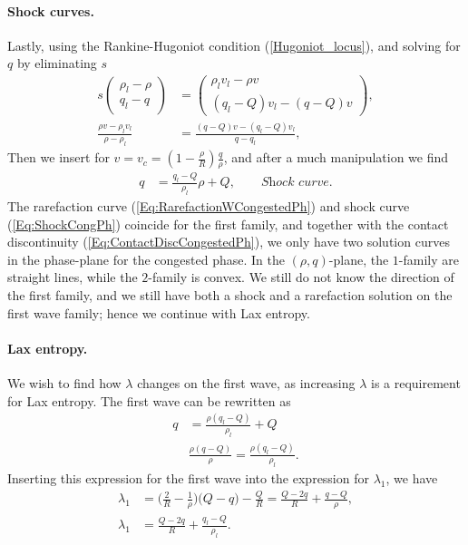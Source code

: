 \documentclass[10pt]{article}
\numberwithin{equation}{section}
\begin{document}
\paragraph{Shock curves.}
Lastly, using the Rankine-Hugoniot condition (\ref{Hugoniot_locus}), and solving for $q$ by eliminating $s$
\begin{align*}
     s \begin{pmatrix} \rho_l - \rho \\ q_l - q \end{pmatrix} &= \begin{pmatrix} \rho_l v_l - \rho v \\ (q_l - Q)v_l - (q - Q)v \end{pmatrix}, \nonumber\\
     \frac{\rho v - \rho_l v_l}{\rho - \rho_l} &= \frac{(q-Q)v - (q_l-Q)v_l}{q - q_l}, \nonumber
\end{align*}
Then we insert for $v = v_c = (1- \frac{\rho}{R})\frac{q}{\rho}$, and after a much manipulation we find
\begin{align}
      q &= \frac{q_l - Q}{\rho_l} \rho + Q,  \quad \quad \textit{Shock curve.}
     \label{Eq:ShockCongPh}
\end{align}
The rarefaction curve (\ref{Eq:RarefactionWCongestedPh}) and shock curve (\ref{Eq:ShockCongPh}) coincide for the first family, and together with the contact discontinuity (\ref{Eq:ContactDiscCongestedPh}), we only have two solution curves in the phase-plane for the congested phase. In the $(\rho,q)$-plane, the $1$-family are straight lines, while the $2$-family is convex.
We still do not know the direction of the first family, and we still have both a shock and a rarefaction solution on the first wave family; hence we continue with Lax entropy. 

\paragraph{Lax entropy.}
We wish to find how $\lambda$ changes on the first wave, as increasing $\lambda$ is a requirement for Lax entropy. The first wave can be rewritten as 
\begin{align*}
q &=  \frac{\rho( q_l - Q)}{\rho_l} + Q \\
 & \frac{\rho( q - Q)}{\rho}  =  \frac{\rho( q_l - Q)}{\rho_l}.
\end{align*}
Inserting this expression for the first wave into the expression for $\lambda_1$, we have
\begin{align}
     \lambda_1 &= \big ( \frac{2}{R} - \frac{1}{\rho} )\big (Q- q) - \frac{Q}{R} 
     = \frac{Q - 2q}{R} + \frac{q-Q}{\rho}, \nonumber \\
     \lambda_1 &= \frac{Q - 2q}{R} + \frac{q_l-Q}{\rho_l}.
     \label{Eq:DirectionOfLambda}
\end{align}
\end{document}

